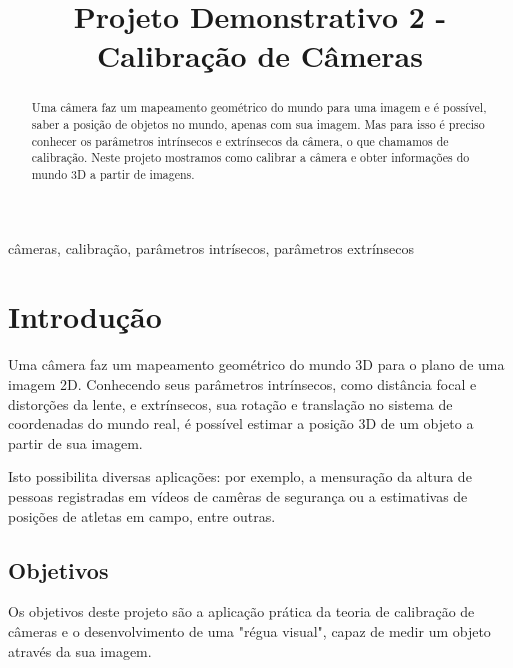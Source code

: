 \documentclass[conference]{IEEEtran}
\begin{document}
\title{Projeto Demonstrativo 2 - Calibração de Câmeras}

\author{
}

\maketitle

\begin{abstract}
Uma câmera faz um mapeamento geométrico do mundo para uma imagem e é possível, saber a posição de objetos no mundo, apenas com sua imagem. Mas para isso é preciso conhecer os parâmetros intrínsecos e extrínsecos da câmera, o que chamamos de calibração. Neste projeto mostramos como calibrar a câmera e obter informações do mundo 3D a partir de imagens.
\end{abstract}

\begin{IEEEkeywords}
câmeras, calibração, parâmetros intrísecos, parâmetros extrínsecos
\end{IEEEkeywords}

\section{Introdução}
Uma câmera faz um mapeamento geométrico do mundo 3D para o plano de uma imagem 2D. Conhecendo seus parâmetros intrínsecos, como distância focal e distorções da lente, e extrínsecos, sua rotação e translação no sistema de coordenadas do mundo real, é possível estimar a posição 3D de um objeto a partir de sua imagem\cite{tese}. 

Isto possibilita diversas aplicações: por exemplo, a mensuração da altura de pessoas registradas em vídeos de camêras de segurança ou a estimativas de posições de atletas em campo, entre outras.

\subsection{Objetivos}
Os objetivos deste projeto são a aplicação prática da teoria de calibração de câmeras e o desenvolvimento de uma "régua visual", capaz de medir um objeto através da sua imagem.
\end{document}
